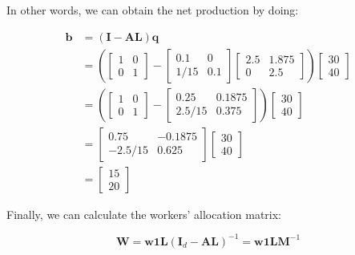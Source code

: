 In other words, we can obtain the net production by doing:

\begin{align}
\boldsymbol{b} & =\left(\boldsymbol{I}-\boldsymbol{A}\boldsymbol{L}\right)\boldsymbol{q}\\
 & = \left(\left[\begin{array}{cc}
1 & 0\\
0 & 1
\end{array}\right]-\left[\begin{array}{cc}
0.1 & 0\\
1/15 & 0.1
\end{array}\right]\left[\begin{array}{cc}
2.5 & 1.875\\
0 & 2.5
\end{array}\right]\right)\left[\begin{array}{c}
30\\
40
\end{array}\right]\\
 & = \left(\left[\begin{array}{cc}
1 & 0\\
0 & 1
\end{array}\right]-\left[\begin{array}{cc}
0.25 & 0.1875\\
2.5/15 & 0.375
\end{array}\right]\right)\left[\begin{array}{c}
30\\
40
\end{array}\right]\\
 & =\left[\begin{array}{cc}
0.75 & -0.1875\\
-2.5/15 & 0.625
\end{array}\right]\left[\begin{array}{c}
30\\
40
\end{array}\right]\\
 & =\left[\begin{array}{c}
15\\
20
\end{array}\right]
\end{align}

Finally, we can calculate the workers' allocation matrix:

\begin{equation}
\boldsymbol{W}=\boldsymbol{w}\boldsymbol{1}\boldsymbol{L}\left(\boldsymbol{I}_{d}-\boldsymbol{A}\boldsymbol{L}\right)^{-1}=\boldsymbol{w}\boldsymbol{1}\boldsymbol{L}\boldsymbol{M}^{-1}
\end{equation}

